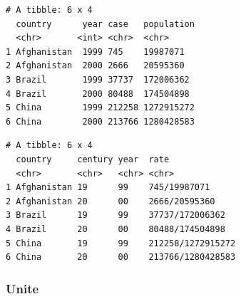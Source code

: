 \documentclass[
  11pt,
]{krantz}
\newenvironment{Shaded}{\begin{snugshade}}{\end{snugshade}}
\newcommand{\CommentTok}[1]{\textcolor[rgb]{0.37,0.37,0.37}{\textit{#1}}}
\newcommand{\DataTypeTok}[1]{\textcolor[rgb]{0.27,0.27,0.27}{#1}}
\newcommand{\DecValTok}[1]{\textcolor[rgb]{0.06,0.06,0.06}{#1}}
\newcommand{\KeywordTok}[1]{\textcolor[rgb]{0.27,0.27,0.27}{\textbf{#1}}}
\newcommand{\NormalTok}[1]{#1}
\newcommand{\OperatorTok}[1]{\textcolor[rgb]{0.43,0.43,0.43}{\textbf{#1}}}
\newcommand{\OtherTok}[1]{\textcolor[rgb]{0.37,0.37,0.37}{#1}}
\newcommand{\StringTok}[1]{\textcolor[rgb]{0.5,0.5,0.5}{#1}}
\begin{document}
\begin{verbatim}
# A tibble: 6 x 4
  country      year case   population
  <chr>       <int> <chr>  <chr>     
1 Afghanistan  1999 745    19987071  
2 Afghanistan  2000 2666   20595360  
3 Brazil       1999 37737  172006362 
4 Brazil       2000 80488  174504898 
5 China        1999 212258 1272915272
6 China        2000 213766 1280428583
\end{verbatim}

\begin{Shaded}
\end{Shaded}

\begin{verbatim}
# A tibble: 6 x 4
  country     century year  rate             
  <chr>       <chr>   <chr> <chr>            
1 Afghanistan 19      99    745/19987071     
2 Afghanistan 20      00    2666/20595360    
3 Brazil      19      99    37737/172006362  
4 Brazil      20      00    80488/174504898  
5 China       19      99    212258/1272915272
6 China       20      00    213766/1280428583
\end{verbatim}

\normalsize

\hypertarget{unite}{%
\subsubsection*{Unite}\label{unite}}
\end{document}
